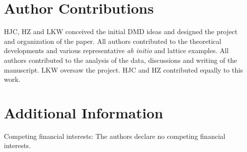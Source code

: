 \section*{Author Contributions}
HJC, HZ and LKW conceived the initial DMD ideas and designed the project and organization of the paper. 
All authors contributed to the theoretical developments and various representative \textit{ab initio} and lattice examples. 
All authors contributed to the analysis of the data, discussions and writing of the manuscript. 
LKW oversaw the project. HJC and HZ contributed equally to this work.
 
\section*{Additional Information}
Competing financial interests: The authors declare no competing financial interests.

